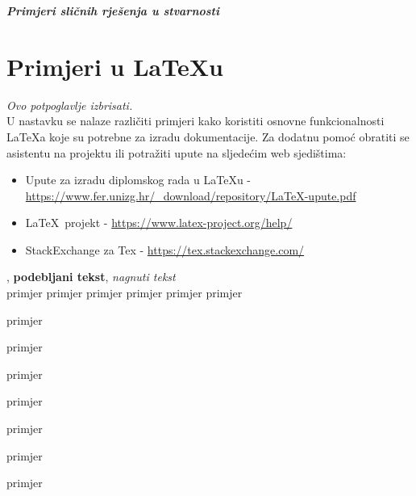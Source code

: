              \newline
            \newline
            \textbf{\textit{Primjeri sličnih rješenja u stvarnosti}}\\ 
      
		
		\section{Primjeri u \LaTeX u}
		
		\textit{Ovo potpoglavlje izbrisati.}\\

		U nastavku se nalaze različiti primjeri kako koristiti osnovne funkcionalnosti \LaTeX a koje su potrebne za izradu dokumentacije. Za dodatnu pomoć obratiti se asistentu na projektu ili potražiti upute na sljedećim web sjedištima:
		\begin{itemize}
			\item Upute za izradu diplomskog rada u \LaTeX u - \url{https://www.fer.unizg.hr/_download/repository/LaTeX-upute.pdf}
			\item \LaTeX\ projekt - \url{https://www.latex-project.org/help/}
			\item StackExchange za Tex - \url{https://tex.stackexchange.com/}\\
		
		\end{itemize} 	


		
		\noindent {}, \textbf{podebljani tekst}, 	\textit{nagnuti tekst}\\
		\noindent \normalsize primjer \large primjer \Large primjer \LARGE {primjer} \huge {primjer} \Huge primjer \normalsize
				
		\begin{packed_item}
			
			\item  primjer
			\item  primjer
			\item  primjer
			\item[] \begin{packed_enum}
				\item primjer
				\item[] \begin{packed_enum}
					\item[1.a] primjer
					\item[b] primjer
				\end{packed_enum}
				\item primjer
			\end{packed_enum}
			
		\end{packed_item}
		
